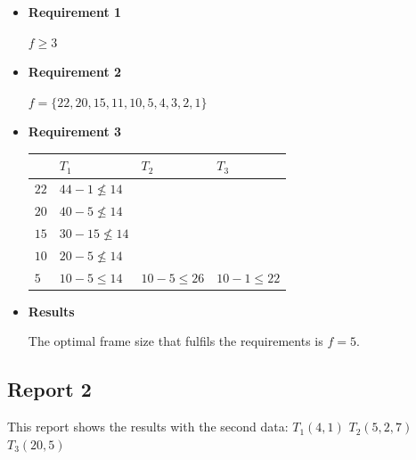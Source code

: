 \documentclass[12pt]{article}
\begin{document}
\begin{itemize}

\item \textbf{Requirement 1}

$f\geq3$

\item \textbf{Requirement 2}

$f=\{22,20,15,11,10,5,4,3,2,1\}$

\item \textbf{Requirement 3}

\begin{tabular}{ l | l l l}
   & $T_{1}$ & $T_{2}$ & $T_{3}$ \\ \hline
  $22$ & $44 - 1 \nleq 14$ &    \\
  $20$ & $40 - 5 \nleq 14$ &  &  \\
  $15$ & $30 - 15 \nleq 14$ & & \\
  $10$ & $20 - 5 \nleq 14$ & & \\
  $5$ & $10 - 5 \leq 14$ & $10 - 5 \leq 26$  & $10 - 1 \leq 22$   \\
\end{tabular}

\item \textbf{Results}

The optimal frame size that fulfils the requirements is $f=5$.

\end{itemize}


\subsection{Report 2}

This report shows the results with the second data: $T_{1}(4,1)$ $T_{2}(5,2,7)$ $T_{3}(20,5)$
\end{document}
